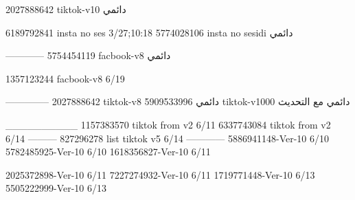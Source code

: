 2027888642 tiktok-v10
دائمي

6189792841 insta no ses
3/27;10:18
5774028106 insta no sesidi
دائمي

------------
5754454119 facbook-v8
دائمي

1357123244 facbook-v8
6/19

--------------
2027888642 tiktok-v8
دائمي
5909533996 tiktok-v1000
دائمي مع التحديث

__________
1157383570 tiktok from v2
6/11
6337743084 tiktok from v2
6/14
---------
827296278 list tiktok v5
6/14
------------
5886941148-Ver-10
6/10
5782485925-Ver-10
6/10
1618356827-Ver-10
6/11

2025372898-Ver-10
6/11
7227274932-Ver-10
6/11
1719771448-Ver-10
6/13
5505222999-Ver-10
6/13
